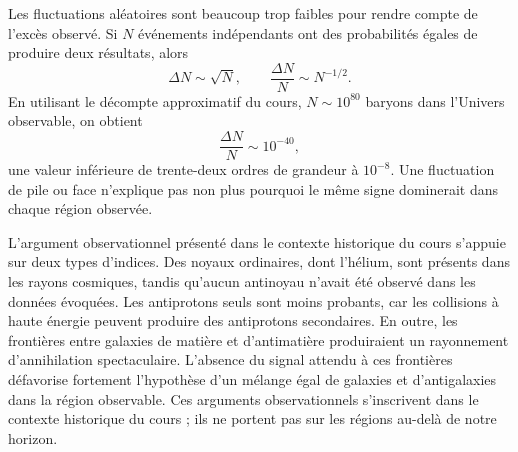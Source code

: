 Les fluctuations aléatoires sont beaucoup trop faibles pour rendre compte de l’excès observé. Si \(N\) événements indépendants ont des probabilités égales de produire deux résultats, alors
\begin{equation}
\Delta N\sim\sqrt N,
\qquad
\frac{\Delta N}{N}\sim N^{-1/2}.
\end{equation}
En utilisant le décompte approximatif du cours, \(N\sim10^{80}\) baryons dans l’Univers observable, on obtient
\begin{equation}
\frac{\Delta N}{N}\sim10^{-40},
\end{equation}
une valeur inférieure de trente-deux ordres de grandeur à \(10^{-8}\). Une fluctuation de pile ou face n’explique pas non plus pourquoi le même signe dominerait dans chaque région observée.

\begin{classroomqa}
\end{classroomqa}

L’argument observationnel présenté dans le contexte historique du cours s’appuie sur deux types d’indices. Des noyaux ordinaires, dont l’hélium, sont présents dans les rayons cosmiques, tandis qu’aucun antinoyau n’avait été observé dans les données évoquées. Les antiprotons seuls sont moins probants, car les collisions à haute énergie peuvent produire des antiprotons secondaires. En outre, les frontières entre galaxies de matière et d’antimatière produiraient un rayonnement d’annihilation spectaculaire. L’absence du signal attendu à ces frontières défavorise fortement l’hypothèse d’un mélange égal de galaxies et d’antigalaxies dans la région observable. Ces arguments observationnels s’inscrivent dans le contexte historique du cours ; ils ne portent pas sur les régions au-delà de notre horizon.

\begin{classroomqa}
\end{classroomqa}

